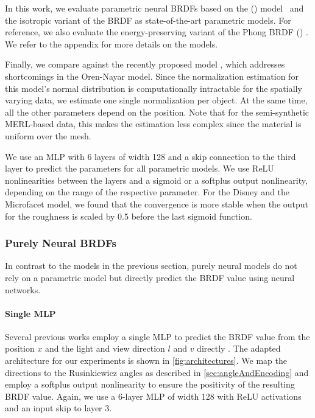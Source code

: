 In this work, we evaluate parametric neural BRDFs based on the \tslong (\ts) model~\cite{torrance1967theory} 
and the isotropic variant of
the \disney BRDF \cite{burley2012physically} as state-of-the-art parametric models. For reference, we also evaluate the energy-preserving variant of the Phong BRDF (\rp) \cite{lafortune1994using}. We refer to the appendix for more details on the models.

Finally, we compare against the recently proposed \fmbrdf model \cite{ichikawa2023fresnel}, which addresses shortcomings in the Oren-Nayar model. 
Since the normalization estimation for this model's normal distribution is computationally intractable for the spatially varying data, we estimate one single normalization per object. At the same time, all the other parameters depend on the position.
Note that for the semi-synthetic MERL-based data, this makes the estimation less complex since the material is uniform over the mesh.

We use an MLP with 6 layers of width 128 and a skip connection to the third layer to predict the parameters for all parametric models. We use ReLU nonlinearities between the layers and a sigmoid or a softplus output nonlinearity, depending on the range of the respective parameter. For the Disney and the Microfacet model, we found that the convergence is more stable when the output for the roughness is scaled by 0.5 before the last sigmoid function.


\subsubsection{Purely Neural BRDFs}
In contrast to the models in the previous section, purely neural models do not rely on a parametric model but directly predict the BRDF value using neural networks.


\paragraph{Single MLP}
Several previous works employ a single MLP to predict the BRDF value from the position $x$ and the light and view direction $l$ and $v$ directly \cite{sztrajman2021neural,Fan2022NeuralLayeredBRDF,Zeng23RelightingNeRFsWithShadowAndHighlightHints}. The adapted architecture for our experiments is shown in \cref{fig:architectures}. We map the directions to the Rusinkiewicz angles as described in \cref{sec:angleAndEncoding} and employ a softplus output nonlinearity to ensure the positivity of the resulting BRDF value. Again, we use a 6-layer MLP of width 128 with ReLU activations and an input skip to layer 3.


